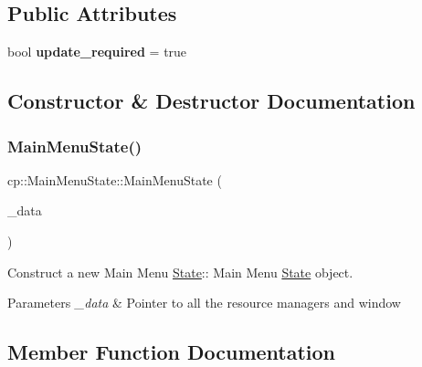 \subsection*{Public Attributes}
\begin{DoxyCompactItemize}
\item 
\mbox{\label{classcp_1_1_main_menu_state_a098358b03eb94f50879bacb68c18ae87}} 
bool {\bfseries update\+\_\+required} = true
\end{DoxyCompactItemize}


\subsection{Constructor \& Destructor Documentation}
\mbox{\label{classcp_1_1_main_menu_state_a6ad449e3f50223aecb2e6639105235e2}} 
\subsubsection{\texorpdfstring{Main\+Menu\+State()}{MainMenuState()}}
{\footnotesize\ttfamily cp\+::\+Main\+Menu\+State\+::\+Main\+Menu\+State (\begin{DoxyParamCaption}\item[{Game\+Data\+Ref}]{\+\_\+data }\end{DoxyParamCaption})}



Construct a new Main Menu \hyperlink{classcp_1_1_state}{State}\+:\+: Main Menu \hyperlink{classcp_1_1_state}{State} object. 


\begin{DoxyParams}{Parameters}
{\em \+\_\+data} & Pointer to all the resource managers and window \\
\hline
\end{DoxyParams}


\subsection{Member Function Documentation}
\mbox{\label{classcp_1_1_main_menu_state_a1aabf2a9efa15f4cfbe6e6680472f955}} 
